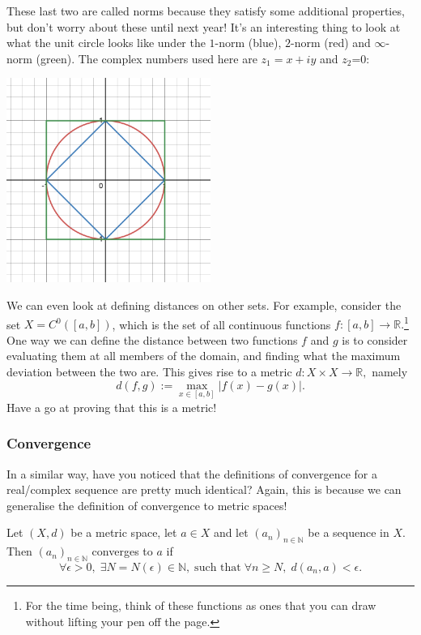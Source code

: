 \documentclass[
  10pt,
  a4paper]{article}
\theoremstyle{plain}
\theoremstyle{definition}
\theoremstyle{plain}
\theoremstyle{plain}
\theoremstyle{plain}
\theoremstyle{plain}
\theoremstyle{definition}
\theoremstyle{definition}
\theoremstyle{remark}
\theoremstyle{remark}
\let\BeginKnitrBlock\begin \let\EndKnitrBlock\end
\begin{document}
These last two are called norms because they satisfy some additional properties, but don't worry about these until next year! It's an interesting thing to look at what the unit circle looks like under the \(1\)-norm (blue), \(2\)-norm (red) and \(\infty\)-norm (green). The complex numbers used here are \(z_1 = x + iy\) and \(z_2\)=0:

\includegraphics[width=0.5\textwidth,height=\textheight]{unitcircle.png}

We can even look at defining distances on other sets. For example, consider the set \(X = C^{0}([a,b])\), which is the set of all continuous functions \(f:[a,b] \to \mathbb{R}.\)\footnote{For the time being, think of these functions as ones that you can draw without lifting your pen off the page.} One way we can define the distance between two functions \(f\) and \(g\) is to consider evaluating them at all members of the domain, and finding what the maximum deviation between the two are. This gives rise to a metric \(d:X\times X \to \mathbb{R},\) namely \[d(f,g) := \max_{x \in [a,b]} \lvert f(x) - g(x) \rvert.\] Have a go at proving that this is a metric!

\hypertarget{convergence}{%
\subsubsection{Convergence}\label{convergence}}

In a similar way, have you noticed that the definitions of convergence for a real/complex sequence are pretty much identical? Again, this is because we can generalise the definition of convergence to metric spaces!

\BeginKnitrBlock{definition}[Convergence]
{\label{def:def4} }Let \((X,d)\) be a metric space, let \(a \in X\) and let \((a_n)_{n\in\mathbb{N}}\) be a sequence in \(X\). Then \((a_n)_{n\in\mathbb{N}}\) converges to \(a\) if \[\forall \epsilon > 0, \; \exists N = N(\epsilon) \in \mathbb{N}, \; \text{such that} \; \forall n \geq N, \; d(a_n,a) < \epsilon.\]
\EndKnitrBlock{definition}
\end{document}
